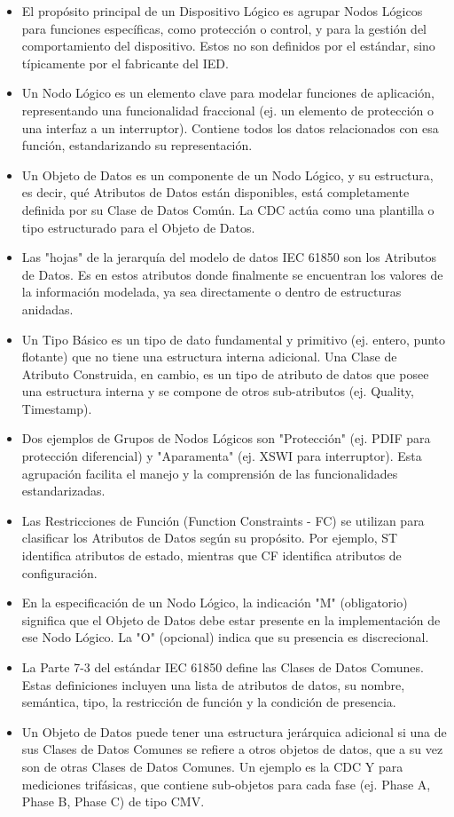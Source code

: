 \documentclass[a5paper]{book}%
\begin{document}
\begin{itemize}
\item El propósito principal de un Dispositivo Lógico es agrupar Nodos Lógicos para funciones específicas, como protección o control, y para la gestión del comportamiento del dispositivo. Estos no son definidos por el estándar, sino típicamente por el fabricante del IED.
\item Un Nodo Lógico es un elemento clave para modelar funciones de aplicación, representando una funcionalidad fraccional (ej. un elemento de protección o una interfaz a un interruptor). Contiene todos los datos relacionados con esa función, estandarizando su representación.
\item Un Objeto de Datos es un componente de un Nodo Lógico, y su estructura, es decir, qué Atributos de Datos están disponibles, está completamente definida por su Clase de Datos Común. La CDC actúa como una plantilla o tipo estructurado para el Objeto de Datos.
\item Las "hojas" de la jerarquía del modelo de datos IEC 61850 son los Atributos de Datos. Es en estos atributos donde finalmente se encuentran los valores de la información modelada, ya sea directamente o dentro de estructuras anidadas.
\item Un Tipo Básico es un tipo de dato fundamental y primitivo (ej. entero, punto flotante) que no tiene una estructura interna adicional. Una Clase de Atributo Construida, en cambio, es un tipo de atributo de datos que posee una estructura interna y se compone de otros sub-atributos (ej. Quality, Timestamp).
\item Dos ejemplos de Grupos de Nodos Lógicos son "Protección" (ej. PDIF para protección diferencial) y "Aparamenta" (ej. XSWI para interruptor). Esta agrupación facilita el manejo y la comprensión de las funcionalidades estandarizadas.
\item Las Restricciones de Función (Function Constraints - FC) se utilizan para clasificar los Atributos de Datos según su propósito. Por ejemplo, ST identifica atributos de estado, mientras que CF identifica atributos de configuración.
\item En la especificación de un Nodo Lógico, la indicación "M" (obligatorio) significa que el Objeto de Datos debe estar presente en la implementación de ese Nodo Lógico. La "O" (opcional) indica que su presencia es discrecional.
\item La Parte 7-3 del estándar IEC 61850 define las Clases de Datos Comunes. Estas definiciones incluyen una lista de atributos de datos, su nombre, semántica, tipo, la restricción de función y la condición de presencia.
\item Un Objeto de Datos puede tener una estructura jerárquica adicional si una de sus Clases de Datos Comunes se refiere a otros objetos de datos, que a su vez son de otras Clases de Datos Comunes. Un ejemplo es la CDC Y para mediciones trifásicas, que contiene sub-objetos para cada fase (ej. Phase A, Phase B, Phase C) de tipo CMV.
\end{itemize}
\end{document}
